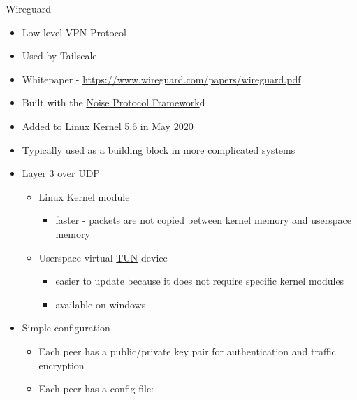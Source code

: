 \label{notes__02051-wireguard.md}
\begin{block}{Wireguard}
\label{notes__02051-wireguard.md__wireguard}
\begin{itemize}
\tightlist
\item
  Low level VPN Protocol
\item
  Used by Tailscale
\item
  Whitepaper - \url{https://www.wireguard.com/papers/wireguard.pdf}
\item
  Built with the \hyperlink{notes__02022-noise.md}{Noise Protocol Framework}d
\item
  Added to Linux Kernel 5.6 in May 2020
\item
  Typically used as a building block in more complicated systems
\item
  Layer 3 over UDP

  \begin{itemize}
  \tightlist
  \item
    Linux Kernel module

    \begin{itemize}
    \tightlist
    \item
      faster - packets are not copied between kernel memory and userspace memory
    \end{itemize}
  \item
    Userspace virtual \href{notes/02021-internet-protocol}{TUN} device

    \begin{itemize}
    \tightlist
    \item
      easier to update because it does not require specific kernel modules
    \item
      available on windows
    \end{itemize}
  \end{itemize}
\item
  Simple configuration

  \begin{itemize}
  \tightlist
  \item
    Each peer has a public/private key pair for authentication and traffic encryption
  \item
    Each peer has a config file:
  \end{itemize}
\end{itemize}

\newpage

\begin{Shaded}
\begin{Highlighting}[]
\KeywordTok{[Interface]}
\OtherTok{=}
\OtherTok{=}\StringTok{ }
\OtherTok{=}


\end{Highlighting}
\end{Shaded}
\end{block}
